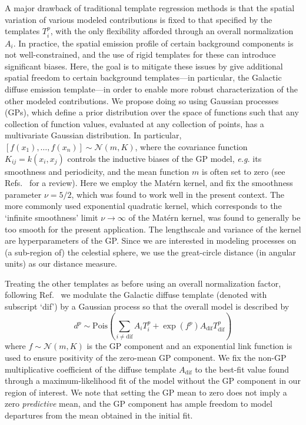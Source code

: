 \documentclass[]{article}
\begin{document}
A major drawback of traditional template regression methods is that the spatial variation of various modeled contributions is fixed to that specified by the templates $T_{i}^{p}$, with the only flexibility afforded through an overall normalization $A_i$. In practice, the spatial emission profile of certain background components is not well-constrained, and the use of rigid templates for these can introduce significant biases. Here, the goal is to mitigate these issues by give additional spatial freedom to certain background templates---in particular, the Galactic diffuse emission template---in order to enable more robust characterization of the other modeled contributions. We propose doing so using Gaussian processes (GPs), which define a prior distribution over the space of functions such that any collection of function values, evaluated at any collection of points, has a multivariate Gaussian distribution. In particular, $\left[f\left(x_{1}\right), \ldots, f\left(x_{n}\right)\right] \sim \mathcal{N}(m, K)$,
where the covariance function $K_{i j}=k\left(x_{i}, x_{j}\right)$ controls the inductive biases of the GP model, \emph{e.g.} its smoothness and periodicity, and the mean function $m$ is often set to zero (see Refs.~\cite{10.5555/1162254,wilson2014covariance} for a review). Here we employ the Mat\'{e}rn kernel, and fix the smoothness parameter $\nu = 5/2$, which was found to work well in the present context. The more commonly used exponential quadratic kernel, which corresponds to the `infinite smoothness' limit $\nu\rightarrow\infty$ of the Mat\'{e}rn kernel, was found to generally be too smooth for the present application. The lengthscale and variance of the kernel are hyperparameters of the GP. Since we are interested in modeling processes on (a sub-region of) the celestial sphere, we use the great-circle distance (in angular units) as our distance measure.

Treating the other templates as before using an overall normalization factor, following Ref.~\cite{Buschmann:2020adf} we modulate the Galactic diffuse template (denoted with subscript `dif') by a Gaussian process so that the overall model is described by
%
\begin{equation}
d^{p} \sim \mathrm{Pois}\left(\sum_{i\neq\mathrm{dif}} A_i T_{i}^{p} + \exp\left(f^{p}\right)A_\mathrm{dif}T_\mathrm{dif}^{p}\right)
\label{eq:poisson_gp}
\end{equation}
%
where $f\sim \mathcal{N}\left(m, K\right)$ is the GP component and an exponential link function is used to ensure positivity of the zero-mean GP component. We fix the non-GP multiplicative coefficient of the diffuse template $A_\mathrm{dif}$ to the best-fit value found through a maximum-likelihood fit of the model without the GP component in our region of interest. We note that setting the GP mean to zero does not imply a zero \emph{predictive} mean, and the GP component has ample freedom to model departures from the mean obtained in the initial fit.
\end{document}
